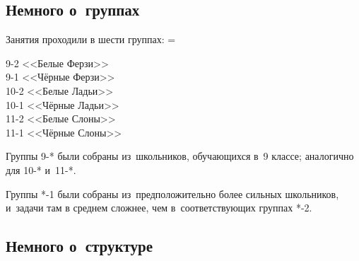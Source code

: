 


\begingroup
\providecommand\ifsourcelinks{\iffalse}
\providecommand\url{\texttt}

\strut

\vfill

\begin{center}
\end{center}

\vfill

\strut

\clearpage


\subsection*{Немного о~группах}

Занятия проходили в шести группах:
\begingroup\multicolsep=\parskip
\begin{multicols}{3}
9-2  <<Белые Ферзи>>
\\
9-1  <<Чёрные Ферзи>>
\\
10-2 <<Белые Ладьи>>
\\
10-1 <<Чёрные Ладьи>>
\\
11-2 <<Белые Слоны>>
\\
11-1 <<Чёрные Слоны>>
\end{multicols}
\endgroup

Группы \mbox{9-*} были собраны из~школьников, обучающихся в~9 классе;
аналогично для \mbox{10-*} и~\mbox{11-*}.

Группы \mbox{*-1} были собраны из~предположительно более сильных школьников,
и~задачи там в среднем сложнее, чем в~соответствующих группах \mbox{*-2}.


\subsection*{Немного о~структуре}

